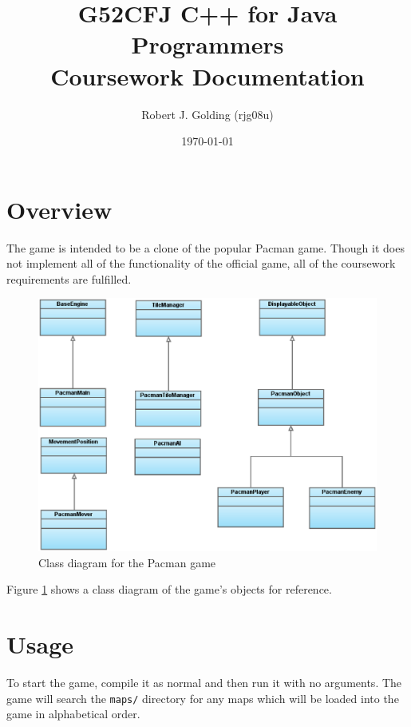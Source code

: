 \documentclass[a4paper,11pt]{article}
\title{G52CFJ C++ for Java Programmers \\ Coursework Documentation}
\author{Robert J. Golding (rjg08u)} \date{\today}
\begin{document}
    \maketitle

    \section{Overview}

    The game is intended to be a clone of the popular Pacman game. Though it
    does not implement all of the functionality of the official game, all of
    the coursework requirements are fulfilled.

    \begin{figure}[ht]
        \begin{center}
            \includegraphics[width=\textwidth]{class-diagram}
        \end{center}
        \caption{Class diagram for the Pacman game}
        \label{fig:class-diagram}
    \end{figure}

    Figure \ref{fig:class-diagram} shows a class diagram of the game's objects
    for reference.

    \section{Usage}

    To start the game, compile it as normal and then run it with no arguments.
    The game will search the \verb!maps/! directory for any maps which will be
    loaded into the game in alphabetical order.
\end{document}
